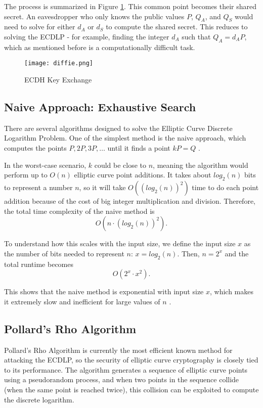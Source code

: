 \documentclass[11pt]{article}
\begin{document}
The process is summarized in Figure \ref{fig:ecdh}. This common point becomes their shared secret. An eavesdropper who only knows the public values \(P\), \(Q_A\), and \(Q_S\) would need to solve for either \(d_A\) or \(d_S\) to compute the shared secret. This reduces to solving the ECDLP - for example, finding the integer \(d_A\) such that \(Q_A = d_A P\), which as mentioned before is a computationally difficult task.

\begin{figure}
    \centering
    \texttt{[image: diffie.png]}
    \caption{ECDH Key Exchange}
    \label{fig:ecdh}
\end{figure}

\subsection{Naive Approach: Exhaustive Search} 
There are several algorithms designed to solve the Elliptic Curve Discrete Logarithm Problem. One of the simplest method is the naive approach, which computes the points \(P,2P,3P,\ldots\) until it finds a point \(kP=Q\) \cite{gill}. 

In the worst-case scenario, \(k\) could be close to \(n\), meaning the algorithm would perform up to \(O(n)\) elliptic curve point additions. It takes about \(log_2(n)\) bits to represent a number \(n\), so it will take \(O((log_2(n))^2)\) time to do each point addition because of the cost of big integer multiplication and division. Therefore, the total time complexity of the naive method is 
\[O(n\cdot(log_2(n))^2).\]

To understand how this scales with the input size, we define the input size \(x\) as the number of bits needed to represent \(n\): \(x=log_2(n)\). Then, \(n=2^x\) and the total runtime becomes 
\[O(2^x\cdot x^2).\] 

This shows that the naive method is exponential with input size \(x\), which makes it extremely slow and inefficient for large values of \(n\) \cite{gill}.




\subsection{Pollard's Rho Algorithm}
Pollard’s Rho Algorithm is currently the most efficient known method for attacking the ECDLP, so the security of elliptic curve cryptography is closely tied to its performance. The algorithm generates a sequence of elliptic curve points using a pseudorandom process, and when two points in the sequence collide (when the same point is reached twice), this collision can be exploited to compute the discrete logarithm.
\end{document}
